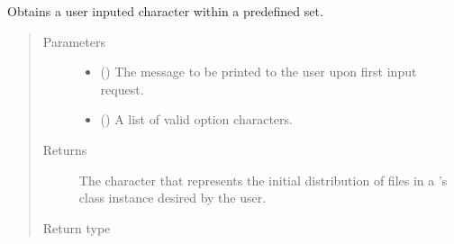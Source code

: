 \documentclass[letterpaper,10pt,english]{sphinxmanual}
\begin{document}
\begin{fulllineitems}
\label{\detokenize{app:app.simfile_generator._input_character_option}}
Obtains a user inputed character within a predefined set.
\begin{quote}\begin{description}
\item[{Parameters}] \leavevmode\begin{itemize}
\item {} 
 () \textendash{} The message to be printed to the user upon first input request.

\item {} 
 (\sphinxstyleliteralemphasis{\sphinxupquote{{[}}}\sphinxstyleliteralemphasis{\sphinxupquote{{]}}}) \textendash{} A list of valid option characters.

\end{itemize}

\item[{Returns}] \leavevmode
The character that represents the initial distribution of files in a
’s class instance desired by the user.

\item[{Return type}] \leavevmode
{}

\end{description}\end{quote}

\end{fulllineitems}

\end{document}

